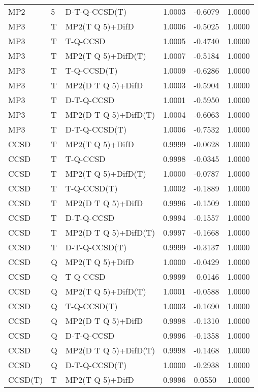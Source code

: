\begin{table}
\begin{tabular}{l l l l l l }
    MP2 & 5 & D-T-Q-CCSD(T) & 1.0003 & -0.6079 & 1.0000 \\ 
    MP3 & T & MP2(T Q 5)+DifD & 1.0006 & -0.5025 & 1.0000 \\ 
    MP3 & T & T-Q-CCSD & 1.0005 & -0.4740 & 1.0000 \\ 
    MP3 & T & MP2(T Q 5)+DifD(T) & 1.0007 & -0.5184 & 1.0000 \\ 
    MP3 & T & T-Q-CCSD(T) & 1.0009 & -0.6286 & 1.0000 \\ 
    MP3 & T & MP2(D T Q 5)+DifD & 1.0003 & -0.5904 & 1.0000 \\ 
    MP3 & T & D-T-Q-CCSD & 1.0001 & -0.5950 & 1.0000 \\ 
    MP3 & T & MP2(D T Q 5)+DifD(T) & 1.0004 & -0.6063 & 1.0000 \\ 
    MP3 & T & D-T-Q-CCSD(T) & 1.0006 & -0.7532 & 1.0000 \\ 
    CCSD & T & MP2(T Q 5)+DifD & 0.9999 & -0.0628 & 1.0000 \\ 
    CCSD & T & T-Q-CCSD & 0.9998 & -0.0345 & 1.0000 \\ 
    CCSD & T & MP2(T Q 5)+DifD(T) & 1.0000 & -0.0787 & 1.0000 \\ 
    CCSD & T & T-Q-CCSD(T) & 1.0002 & -0.1889 & 1.0000 \\ 
    CCSD & T & MP2(D T Q 5)+DifD & 0.9996 & -0.1509 & 1.0000 \\ 
    CCSD & T & D-T-Q-CCSD & 0.9994 & -0.1557 & 1.0000 \\ 
    CCSD & T & MP2(D T Q 5)+DifD(T) & 0.9997 & -0.1668 & 1.0000 \\ 
    CCSD & T & D-T-Q-CCSD(T) & 0.9999 & -0.3137 & 1.0000 \\ 
    CCSD & Q & MP2(T Q 5)+DifD & 1.0000 & -0.0429 & 1.0000 \\ 
    CCSD & Q & T-Q-CCSD & 0.9999 & -0.0146 & 1.0000 \\ 
    CCSD & Q & MP2(T Q 5)+DifD(T) & 1.0001 & -0.0588 & 1.0000 \\ 
    CCSD & Q & T-Q-CCSD(T) & 1.0003 & -0.1690 & 1.0000 \\ 
    CCSD & Q & MP2(D T Q 5)+DifD & 0.9998 & -0.1310 & 1.0000 \\ 
    CCSD & Q & D-T-Q-CCSD & 0.9996 & -0.1358 & 1.0000 \\ 
    CCSD & Q & MP2(D T Q 5)+DifD(T) & 0.9998 & -0.1468 & 1.0000 \\ 
    CCSD & Q & D-T-Q-CCSD(T) & 1.0000 & -0.2938 & 1.0000 \\ 
    CCSD(T) & T & MP2(T Q 5)+DifD & 0.9996 & 0.0550 & 1.0000 \\ 

\end{tabular}
\end{table}
